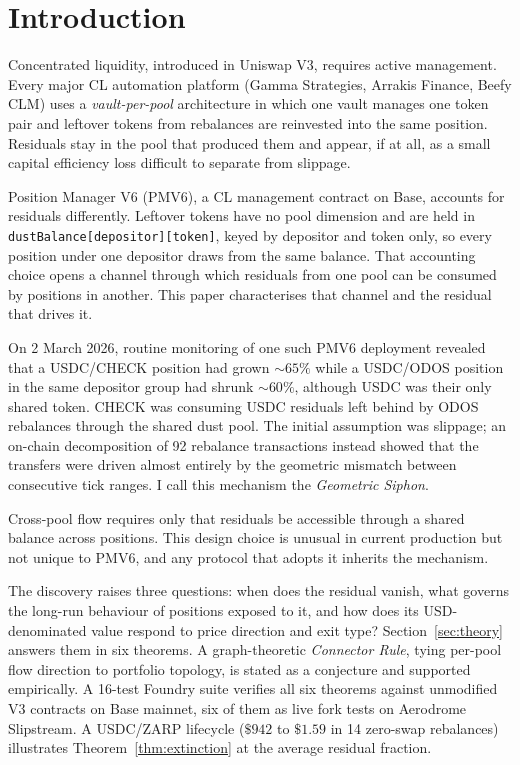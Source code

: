 \documentclass[11pt,a4paper]{article}
\theoremstyle{plain}
\begin{document}
\section{Introduction}\label{sec:introduction}

Concentrated liquidity, introduced in Uniswap V3,\cite{adams2021} requires active management. Every major CL automation platform (Gamma Strategies, Arrakis Finance, Beefy CLM) uses a \emph{vault-per-pool} architecture in which one vault manages one token pair and leftover tokens from rebalances are reinvested into the same position. Residuals stay in the pool that produced them and appear, if at all, as a small capital efficiency loss difficult to separate from slippage.

Position Manager V6 (PMV6), a CL management contract on Base, accounts for residuals differently. Leftover tokens have no pool dimension and are held in \texttt{dustBalance[depositor][token]}, keyed by depositor and token only, so every position under one depositor draws from the same balance. That accounting choice opens a channel through which residuals from one pool can be consumed by positions in another. This paper characterises that channel and the residual that drives it.

On 2 March 2026, routine monitoring of one such PMV6 deployment revealed that a USDC/CHECK position had grown ${\sim}65\%$ while a USDC/ODOS position in the same depositor group had shrunk ${\sim}60\%$, although USDC was their only shared token. CHECK was consuming USDC residuals left behind by ODOS rebalances through the shared dust pool. The initial assumption was slippage; an on-chain decomposition of 92 rebalance transactions instead showed that the transfers were driven almost entirely by the geometric mismatch between consecutive tick ranges. I call this mechanism the \emph{Geometric Siphon}.

Cross-pool flow requires only that residuals be accessible through a shared balance across positions. This design choice is unusual in current production but not unique to PMV6, and any protocol that adopts it inherits the mechanism.

The discovery raises three questions: when does the residual vanish, what governs the long-run behaviour of positions exposed to it, and how does its USD-denominated value respond to price direction and exit type? Section~\ref{sec:theory} answers them in six theorems. A graph-theoretic \emph{Connector Rule}, tying per-pool flow direction to portfolio topology, is stated as a conjecture and supported empirically. A 16-test Foundry suite verifies all six theorems against unmodified V3 contracts on Base mainnet, six of them as live fork tests on Aerodrome Slipstream. A USDC/ZARP lifecycle ($\$942$ to $\$1.59$ in 14 zero-swap rebalances) illustrates Theorem~\ref{thm:extinction} at the average residual fraction.
\end{document}
